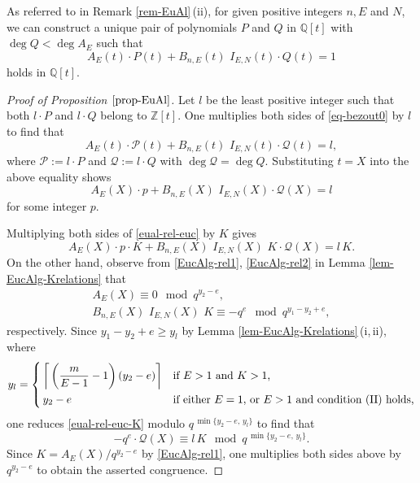 \documentclass[11pt]{amsart}
\numberwithin{equation}{section}
\begin{document}
As referred to in Remark \ref{rem-EuAl}\,(ii), for given positive integers $n,E$ and $N$, we can construct a unique pair of polynomials $P$ and $Q$ in $\mathbb Q[t]$ with $\deg Q< \deg A_E$ such that
\begin{equation}\label{eq-bezout0}
A_E(t) \cdot P(t) + B_{n,E}(t) \,\,I_{E,N}(t) \cdot Q(t) = 1
\end{equation}
holds in $\mathbb Q[t]$.

\begin{proof}[Proof of Proposition $\ref{prop-EuAl}$]
Let $l$ be the least positive integer such that both $l \cdot P$ and $l \cdot Q$ belong to $\mathbb Z[t]$.
One multiplies both sides of \eqref{eq-bezout0} by $l$ to find that
\[
A_E(t) \cdot \mathcal P(t)+ B_{n,E}(t) \,\, I_{E,N}(t) \cdot \mathcal Q(t)=l,
\]
where $\mathcal P:=l \cdot P$ and $\mathcal Q:=l \cdot Q$ with $\deg \mathcal Q=\deg Q$.
Substituting $t=X$ into the above equality shows
\begin{equation}\label{eual-rel-euc}
A_E(X) \cdot p+B_{n,E}(X) \,\, I_{E,N}(X) \cdot \mathcal Q(X)=l
\end{equation}
for some integer $p$.

Multiplying both sides of \eqref{eual-rel-euc} by $K$ gives
\begin{equation}\label{eual-rel-euc-K}
A_E(X) \cdot p \cdot K+B_{n,E}(X) \,\, I_{E,N}(X) \,\, K \cdot \mathcal Q(X)=l\,K.
\end{equation}
On the other hand, observe from \eqref{EucAlg-rel1}, \eqref{EucAlg-rel2} in Lemma \ref{lem-EucAlg-Krelations} that
\begin{gather*}
A_E(X) \equiv 0 \mod{q^{y_2-e}}, \\
B_{n,E}(X)\,\,I_{E,N}(X)\,\,K \equiv -q^e \mod{q^{y_1-y_2+e}},
\end{gather*}
respectively.
Since $y_1-y_2+e \ge y_l$ by Lemma \ref{lem-EucAlg-Krelations}\,(i,\,ii), where 
\begin{align*}
y_l=
\begin{dcases}
\,\bigg \lceil\,\bigg(\frac{m}{E-1}-1\bigg)\,(y_2-e) \bigg \rceil & \text{if $E>1$ and $K>1$,}\\
\,y_2-e & \text{if either $E=1,$ or $E>1$ and condition {\rm (II)} holds,}
\end{dcases}
\end{align*}
one reduces \eqref{eual-rel-euc-K} modulo $q^{\,\min\{y_2 - e,\,y_l\}}$ to find that
\[
-q^e \cdot \mathcal Q(X) \equiv l\,K \mod{q^{\,\min\{y_2 - e,\,y_l\}}}.
\]
Since $K=A_E(X)/q^{y_2 - e}$ by \eqref{EucAlg-rel1}, one multiplies both sides above by $q^{y_2 - e}$ to obtain the asserted congruence.
\end{proof}
\end{document}
